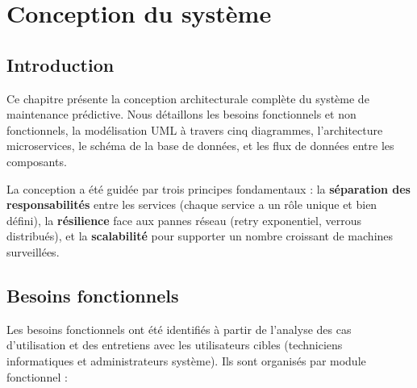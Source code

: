 \chapter{Conception du système}

\section{Introduction}

Ce chapitre présente la conception architecturale complète du système de maintenance
prédictive. Nous détaillons les besoins fonctionnels et non fonctionnels, la modélisation
UML à travers cinq diagrammes, l'architecture microservices, le schéma de la base de
données, et les flux de données entre les composants.

La conception a été guidée par trois principes fondamentaux : la \textbf{séparation des
responsabilités} entre les services (chaque service a un rôle unique et bien défini),
la \textbf{résilience} face aux pannes réseau (retry exponentiel, verrous distribués),
et la \textbf{scalabilité} pour supporter un nombre croissant de machines surveillées.

\section{Besoins fonctionnels}

Les besoins fonctionnels ont été identifiés à partir de l'analyse des cas d'utilisation
et des entretiens avec les utilisateurs cibles (techniciens informatiques et administrateurs
système). Ils sont organisés par module fonctionnel :

